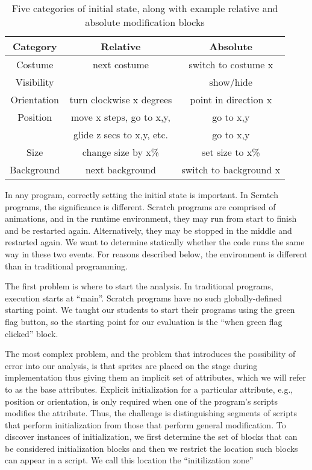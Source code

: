 \begin{table}
\centering
\begin{tabular}{|c|c|c|} \hline
Category & Relative&Absolute\\ \hline \hline
Costume& next costume & switch to costume x\\ \hline
Visibility& & show/hide\\ \hline
Orientation&turn clockwise x degrees&point in direction x\\ \hline
Position&move x steps, go to x,y,&go to x,y\\
&glide z secs to x,y, etc.&go to x,y\\ \hline
Size&change size by x\% & set size to x\%\\ \hline
Background&next background & switch to background x\\ \hline
\end{tabular}
\caption{Five categories of initial state, along with example relative and
  absolute modification blocks}
\end{table}


In any program, correctly setting the initial state is important.  In Scratch
programs, the significance is different.  Scratch programs are comprised of
animations, and in the runtime environment, they may run from start to finish
and be restarted again.  Alternatively, they may be stopped in the middle and
restarted again.  We want to determine statically whether the code runs the
same way in these two events.  For reasons described below, the environment is
different than in traditional programming.

The first problem is where to start the analysis.  In traditional programs,
execution starts at ``main''.  Scratch programs have no such globally-defined
starting point.  We taught our students to start their programs using the green
flag button, so the starting point for our evaluation is the ``when green flag
clicked'' block.

The most complex problem, and the problem that introduces the possibility of
error into our analysis, is that sprites are placed on the stage during
implementation thus giving them an implicit set of attributes, which we will
refer to as the base attributes. Explicit initialization for a particular
attribute, e.g., position or orientation, is only required when one of the
program's scripts modifies the attribute. Thus, the challenge is distinguishing
segments of scripts that perform initialization from those that perform general
modification. To discover instances of initialization, we first determine the
set of blocks that can be considered initialization blocks and then we restrict
the location such blocks can appear in a script. We call this location the
``initilization zone''

